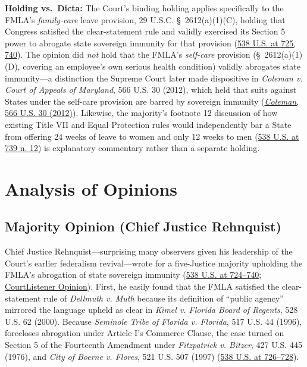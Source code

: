 \documentclass[12pt]{article}
\begin{document}
\textbf{Holding vs.\ Dicta:} The Court's binding holding applies specifically to the FMLA's \textit{family-care} leave provision, 29 U.S.C. \S~2612(a)(1)(C), holding that Congress satisfied the clear-statement rule and validly exercised its Section 5 power to abrogate state sovereign immunity for that provision (\href{https://supreme.justia.com/cases/federal/us/538/721/}{538 U.S. at 725, 740}). The opinion did \textit{not} hold that the FMLA's \textit{self-care} provision (\S~2612(a)(1)(D), covering an employee's own serious health condition) validly abrogates state immunity---a distinction the Supreme Court later made dispositive in \textit{Coleman v. Court of Appeals of Maryland}, 566 U.S. 30 (2012), which held that suits against States under the self-care provision are barred by sovereign immunity (\href{https://supreme.justia.com/cases/federal/us/566/30/}{\textit{Coleman}, 566 U.S. 30 (2012)}). Likewise, the majority's footnote 12 discussion of how existing Title VII and Equal Protection rules would independently bar a State from offering 24 weeks of leave to women and only 12 weeks to men (\href{https://supreme.justia.com/cases/federal/us/538/721/}{538 U.S. at 739 n. 12}) is explanatory commentary rather than a separate holding.

\section{Analysis of Opinions}

\subsection{Majority Opinion (Chief Justice Rehnquist)}
Chief Justice Rehnquist---surprising many observers given his leadership of the Court's earlier federalism revival---wrote for a five-Justice majority upholding the FMLA's abrogation of state sovereign immunity (\href{https://supreme.justia.com/cases/federal/us/538/721/}{538 U.S. at 724--740}; \href{https://www.courtlistener.com/opinion/127926/nevada-department-of-human-resources-v-hibbs/}{CourtListener Opinion}). First, he easily found that the FMLA satisfied the clear-statement rule of \textit{Dellmuth v. Muth} because its definition of ``public agency'' mirrored the language upheld as clear in \textit{Kimel v. Florida Board of Regents}, 528 U.S. 62 (2000). Because \textit{Seminole Tribe of Florida v. Florida}, 517 U.S. 44 (1996), forecloses abrogation under Article I's Commerce Clause, the case turned on Section 5 of the Fourteenth Amendment under \textit{Fitzpatrick v. Bitzer}, 427 U.S. 445 (1976), and \textit{City of Boerne v. Flores}, 521 U.S. 507 (1997) (\href{https://supreme.justia.com/cases/federal/us/538/721/}{538 U.S. at 726--728}).
\end{document}
